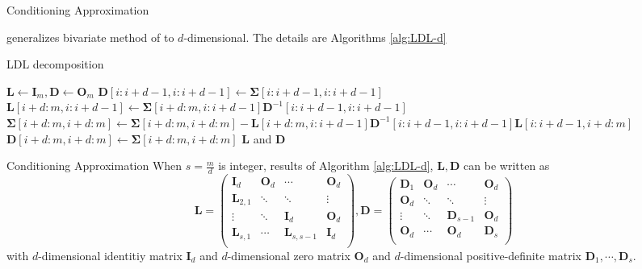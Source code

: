 \begin{frame}{Conditioning Approximation}

	\citet{cao2019hierarchical} generalizes bivariate method of \citet{trinh2015bivariate} to $d$-dimensional. The details are Algorithms \ref{alg:LDL-d}
	
	\begin{algorithm}[H]
			\caption{LDL decomposition}
			\begin{algorithmic}[1]
				\scriptsize
				\State $\mathbf{L} \leftarrow \mathbf{I}_m, \mathbf{D} \leftarrow \mathbf{O}_m$
				\State $\mathbf{D}[i:i+d-1,i:i+d-1] \leftarrow \boldsymbol{\Sigma}[i:i+d-1,i:i+d-1]$
				\State $\mathbf{L}[i+d:m,i:i+d-1] \leftarrow \boldsymbol{\Sigma}[i+d:m,i:i+d-1]\mathbf{D}^{-1}[i:i+d-1,i:i+d-1]$
				\State $\boldsymbol{\Sigma}[i+d:m,i+d:m]\leftarrow\boldsymbol{\Sigma}[i+d:m,i+d:m]-\mathbf{L}[i+d:m,i:i+d-1] \mathbf{D}^{-1}[i:i+d-1,i:i+d-1] \mathbf{L}[i:i+d-1,i+d:m]$
				\State $\mathbf{D}[i+d:m,i+d:m] \leftarrow \boldsymbol{\Sigma}[i+d:m,i+d:m]$
				\EndIf
				\EndFor
				\State\Return $\mathbf{L}$ and $\mathbf{D}$
				\EndProcedure
			\end{algorithmic}\label{alg:LDL-d}
		\end{algorithm}
\end{frame}

\begin{frame}{Conditioning Approximation}
	When $s=\frac{m}{d}$ is integer, results of Algorithm \ref{alg:LDL-d}, $\mathbf{L}, \mathbf{D}$ can be written as
		$$
		\mathbf{L} = \begin{pmatrix}
		\mathbf{I}_d & \mathbf{O}_d & \cdots &\mathbf{O}_d\\
		\mathbf{L}_{2,1} & \ddots & \ddots &\vdots\\
		\vdots & \ddots & \mathbf{I}_d & \mathbf{O}_d\\
		\mathbf{L}_{s,1} & \cdots & \mathbf{L}_{s,s-1} &\mathbf{I}_d\\
		\end{pmatrix},
		\mathbf{D} = \begin{pmatrix}
		\mathbf{D}_1 & \mathbf{O}_d & \cdots &\mathbf{O}_d\\
		\mathbf{O}_{d} & \ddots & \ddots &\vdots\\
		\vdots & \ddots & \mathbf{D}_{s-1} & \mathbf{O}_d\\
		\mathbf{O}_d & \cdots & \mathbf{O}_d &\mathbf{D}_s\\
		\end{pmatrix}
		$$
		with $d$-dimensional identitiy matrix $\mathbf{I}_d$ and $d$-dimensional zero matrix $\mathbf{O}_d$ and $d$-dimensional positive-definite matrix $\mathbf{D}_1,\cdots,\mathbf{D}_s$. 
\end{frame}

